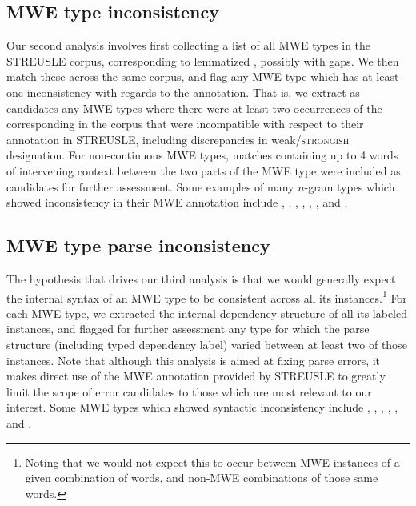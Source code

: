 \documentclass[output=paper,modfonts,nonflat]{langsci/langscibook}
\begin{document}
\subsection{MWE type inconsistency}

Our second analysis involves first collecting a list of all MWE types in the STREUSLE corpus, corresponding to lemmatized \ngram[s], possibly with gaps. We then match these \ngram[s] across the same corpus, and flag any MWE type which has at least one inconsistency with regards to the annotation. That is, we extract as candidates any MWE types where there were at least two occurrences of the corresponding \ngram in the corpus that were incompatible with respect to their annotation in STREUSLE, including discrepancies in weak/\textsc{strongish} designation. For non-continuous MWE types, matches containing up to 4 words of intervening context between the two parts of the MWE type were included as candidates for further assessment. Some examples of many $n$-gram types which showed inconsistency in their MWE annotation include , , , , , , and .

\subsection{MWE type parse inconsistency}

The hypothesis that drives our third analysis is that we would generally expect the internal syntax of an MWE type to be consistent across all its instances.\footnote{Noting that we would not expect this to occur between MWE instances of a given combination of words, and non-MWE combinations of those same words.}  For each MWE type, we extracted the internal dependency structure of all its labeled instances, and flagged for further assessment any type for which the parse structure (including typed dependency label) varied between at least two of those instances. Note that although this analysis is aimed at fixing parse errors, it makes direct use of the MWE annotation provided by STREUSLE to greatly limit the scope of error candidates to those which are most relevant to our interest. Some MWE types which showed syntactic inconsistency include , , , , , and .
\end{document}
